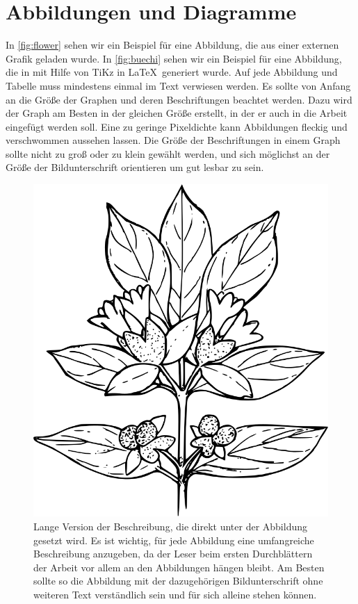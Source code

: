\section{Abbildungen und Diagramme}

In \vref{fig:flower} sehen wir ein Beispiel für eine Abbildung, die aus einer externen Grafik geladen wurde. In \vref{fig:buechi} sehen wir ein Beispiel für eine Abbildung, die in mit Hilfe von TiKz in \LaTeX\ generiert wurde. Auf jede Abbildung und Tabelle muss mindestens einmal im Text verwiesen werden. Es sollte von Anfang an die Größe der Graphen und deren Beschriftungen beachtet werden. Dazu wird der Graph am Besten in der gleichen Größe erstellt, in der er auch in die Arbeit eingefügt werden soll. Eine zu geringe Pixeldichte kann Abbildungen fleckig und verschwommen aussehen lassen. Die Größe der Beschriftungen in einem Graph sollte nicht zu groß oder zu klein gewählt werden, und sich möglichst an der Größe der Bildunterschrift orientieren um gut lesbar zu sein.


\begin{figure} %
  \centering
  \includegraphics[width=.5\textwidth]{images/flower.png}
  \caption[Kurzfassung der Beschreibung für das Abbildungsverzeichnis]{Lange Version der Beschreibung, die direkt unter der Abbildung gesetzt wird. Es ist wichtig, für jede Abbildung eine umfangreiche Beschreibung anzugeben, da der Leser beim ersten Durchblättern der Arbeit vor allem an den Abbildungen hängen bleibt. Am Besten sollte so die Abbildung mit der dazugehörigen Bildunterschrift ohne weiteren Text verständlich sein und für sich alleine stehen können.}
  \label{fig:flower}
\end{figure}

